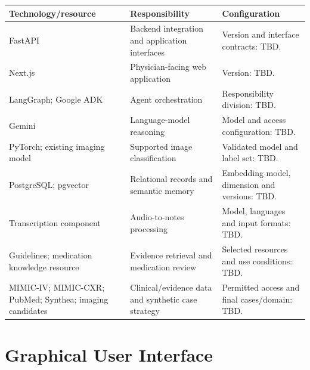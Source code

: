 \begin{reporttable}
\centering
\small
\caption{Software technologies and processing dependencies used in the Zeest design.}
\label{tab:kashaf:software}
\begin{tabular}{|p{}|p{}|p{}|}
\hline
Technology/resource & Responsibility & Configuration \\ \hline
FastAPI & Backend integration and application interfaces & Version and interface contracts: TBD. \\ \hline
Next.js & Physician-facing web application & Version: TBD. \\ \hline
LangGraph; Google ADK & Agent orchestration & Responsibility division: TBD. \\ \hline
Gemini & Language-model reasoning & Model and access configuration: TBD. \\ \hline
PyTorch; existing imaging model & Supported image classification & Validated model and label set: TBD. \\ \hline
PostgreSQL; pgvector & Relational records and semantic memory & Embedding model, dimension and versions: TBD. \\ \hline
Transcription component & Audio-to-notes processing & Model, languages and input formats: TBD. \\ \hline
Guidelines; medication knowledge resource & Evidence retrieval and medication review & Selected resources and use conditions: TBD. \\ \hline
MIMIC-IV; MIMIC-CXR; PubMed; Synthea; imaging candidates & Clinical/evidence data and synthetic case strategy & Permitted access and final cases/domain: TBD. \\ \hline
\end{tabular}
\end{reporttable}


\section{Graphical User Interface}

